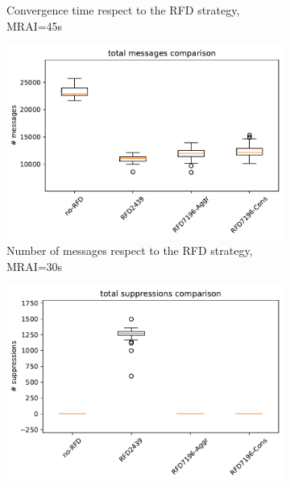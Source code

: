 \begin{figure}[H]
\begin{subfigure}[b]{0.325\textwidth}
         \caption{Convergence time respect to the RFD strategy, MRAI=45s}
         \label{fig:1000_RFD_MRAI30_time_elephant}
     \end{subfigure}
     \hfill
     \begin{subfigure}[b]{0.325\textwidth}
         \centering
         \includegraphics[width=\textwidth]{images/RFD/miceVSelephants/MultiMRAI/45/elephants/cisco_1000MRAI45_rfd_comparison_messages_boxplot.pdf}
         \caption{Number of messages respect to the RFD strategy, MRAI=30s}
         \label{fig:1000_RFD_MRAI30_messages_elephant}
     \end{subfigure}
     \hfill
     \begin{subfigure}[b]{0.325\textwidth}
         \centering
         \includegraphics[width=\textwidth]{images/RFD/miceVSelephants/MultiMRAI/45/elephants/cisco_1000MRAI45_rfd_comparison_suppressions_boxplot.pdf}

\end{subfigure}
\end{figure}
